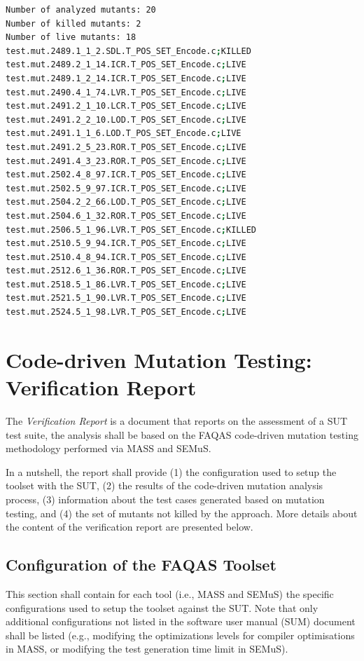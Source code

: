 \begin{lstlisting}[language=bash, label=semus_output, caption=SEMuS output.]
Number of analyzed mutants: 20
Number of killed mutants: 2
Number of live mutants: 18
test.mut.2489.1_1_2.SDL.T_POS_SET_Encode.c;KILLED
test.mut.2489.2_1_14.ICR.T_POS_SET_Encode.c;LIVE
test.mut.2489.1_2_14.ICR.T_POS_SET_Encode.c;LIVE
test.mut.2490.4_1_74.LVR.T_POS_SET_Encode.c;LIVE
test.mut.2491.2_1_10.LCR.T_POS_SET_Encode.c;LIVE
test.mut.2491.2_2_10.LOD.T_POS_SET_Encode.c;LIVE
test.mut.2491.1_1_6.LOD.T_POS_SET_Encode.c;LIVE
test.mut.2491.2_5_23.ROR.T_POS_SET_Encode.c;LIVE
test.mut.2491.4_3_23.ROR.T_POS_SET_Encode.c;LIVE
test.mut.2502.4_8_97.ICR.T_POS_SET_Encode.c;LIVE
test.mut.2502.5_9_97.ICR.T_POS_SET_Encode.c;LIVE
test.mut.2504.2_2_66.LOD.T_POS_SET_Encode.c;LIVE
test.mut.2504.6_1_32.ROR.T_POS_SET_Encode.c;LIVE
test.mut.2506.5_1_96.LVR.T_POS_SET_Encode.c;KILLED
test.mut.2510.5_9_94.ICR.T_POS_SET_Encode.c;LIVE
test.mut.2510.4_8_94.ICR.T_POS_SET_Encode.c;LIVE
test.mut.2512.6_1_36.ROR.T_POS_SET_Encode.c;LIVE
test.mut.2518.5_1_86.LVR.T_POS_SET_Encode.c;LIVE
test.mut.2521.5_1_90.LVR.T_POS_SET_Encode.c;LIVE
test.mut.2524.5_1_98.LVR.T_POS_SET_Encode.c;LIVE
\end{lstlisting}


\section{Code-driven Mutation Testing: Verification Report}


The \emph{Verification Report} is a document that reports on the assessment of a SUT test suite, the analysis shall be based on the FAQAS code-driven mutation testing methodology performed via MASS and SEMuS.

In a nutshell, the report shall provide (1) the configuration used to setup the toolset with the SUT, (2) the results of the code-driven mutation analysis process, (3) information about the test cases generated based on mutation testing, and (4) the set of mutants not killed by the approach. More details about the content of the verification report are presented below.

\subsection{Configuration of the FAQAS Toolset}

This section shall contain for each tool (i.e., MASS and SEMuS) the specific configurations used to setup the toolset against the SUT. Note that only additional configurations not listed in the software user manual (SUM) document shall be listed (e.g., modifying the optimizations levels for compiler optimisations in MASS, or modifying the test generation time limit in SEMuS).

